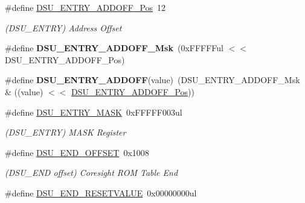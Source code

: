 \begin{DoxyCompactItemize}
\item 
\hypertarget{group___s_a_m_l21___d_s_u_gab71d31f158a348f32e1a357991d598e4}{}\#define \hyperlink{group___s_a_m_l21___d_s_u_gab71d31f158a348f32e1a357991d598e4}{D\+S\+U\+\_\+\+E\+N\+T\+R\+Y\+\_\+\+A\+D\+D\+O\+F\+F\+\_\+\+Pos}~12\label{group___s_a_m_l21___d_s_u_gab71d31f158a348f32e1a357991d598e4}

\begin{DoxyCompactList}\small\item\em (D\+S\+U\+\_\+\+E\+N\+T\+R\+Y) Address Offset \end{DoxyCompactList}\item 
\hypertarget{group___s_a_m_l21___d_s_u_ga5aed4c8d11cb4035eb6e903e323f1bd2}{}\#define {\bfseries D\+S\+U\+\_\+\+E\+N\+T\+R\+Y\+\_\+\+A\+D\+D\+O\+F\+F\+\_\+\+Msk}~(0x\+F\+F\+F\+F\+Ful $<$$<$ D\+S\+U\+\_\+\+E\+N\+T\+R\+Y\+\_\+\+A\+D\+D\+O\+F\+F\+\_\+\+Pos)\label{group___s_a_m_l21___d_s_u_ga5aed4c8d11cb4035eb6e903e323f1bd2}

\item 
\hypertarget{group___s_a_m_l21___d_s_u_ga2b06caa1302db199b3b62849e2b5200f}{}\#define {\bfseries D\+S\+U\+\_\+\+E\+N\+T\+R\+Y\+\_\+\+A\+D\+D\+O\+F\+F}(value)~(D\+S\+U\+\_\+\+E\+N\+T\+R\+Y\+\_\+\+A\+D\+D\+O\+F\+F\+\_\+\+Msk \& ((value) $<$$<$ \hyperlink{group___s_a_m_l21___d_s_u_gab71d31f158a348f32e1a357991d598e4}{D\+S\+U\+\_\+\+E\+N\+T\+R\+Y\+\_\+\+A\+D\+D\+O\+F\+F\+\_\+\+Pos}))\label{group___s_a_m_l21___d_s_u_ga2b06caa1302db199b3b62849e2b5200f}

\item 
\hypertarget{group___s_a_m_l21___d_s_u_gaf0cc765a53fad8ea6a66d738de6e1613}{}\#define \hyperlink{group___s_a_m_l21___d_s_u_gaf0cc765a53fad8ea6a66d738de6e1613}{D\+S\+U\+\_\+\+E\+N\+T\+R\+Y\+\_\+\+M\+A\+S\+K}~0x\+F\+F\+F\+F\+F003ul\label{group___s_a_m_l21___d_s_u_gaf0cc765a53fad8ea6a66d738de6e1613}

\begin{DoxyCompactList}\small\item\em (D\+S\+U\+\_\+\+E\+N\+T\+R\+Y) M\+A\+S\+K Register \end{DoxyCompactList}\item 
\hypertarget{group___s_a_m_l21___d_s_u_gae6ea9aca4f5434a9e01445fc08782f59}{}\#define \hyperlink{group___s_a_m_l21___d_s_u_gae6ea9aca4f5434a9e01445fc08782f59}{D\+S\+U\+\_\+\+E\+N\+D\+\_\+\+O\+F\+F\+S\+E\+T}~0x1008\label{group___s_a_m_l21___d_s_u_gae6ea9aca4f5434a9e01445fc08782f59}

\begin{DoxyCompactList}\small\item\em (D\+S\+U\+\_\+\+E\+N\+D offset) Coresight R\+O\+M Table End \end{DoxyCompactList}\item 
\hypertarget{group___s_a_m_l21___d_s_u_gaa4380f101e160fd70e41789f57871f63}{}\#define \hyperlink{group___s_a_m_l21___d_s_u_gaa4380f101e160fd70e41789f57871f63}{D\+S\+U\+\_\+\+E\+N\+D\+\_\+\+R\+E\+S\+E\+T\+V\+A\+L\+U\+E}~0x00000000ul\label{group___s_a_m_l21___d_s_u_gaa4380f101e160fd70e41789f57871f63}


\end{DoxyCompactItemize}
